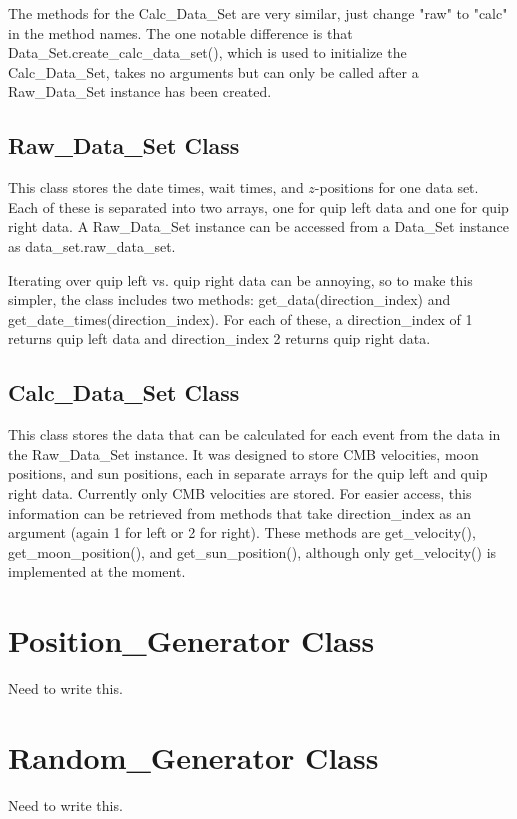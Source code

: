 \documentclass[12pt]{report}
\begin{document}
The methods for the Calc\_Data\_Set are very similar, just change "raw" to "calc" in the method names.  The one notable difference is that Data\_Set.create\_calc\_data\_set(), which is used to initialize the Calc\_Data\_Set, takes no arguments but can only be called after a Raw\_Data\_Set instance has been created.

\section{Raw\_Data\_Set Class}
This class stores the date times, wait times, and $z$-positions for one data set.  Each of these is separated into two arrays, one for quip left data and one for quip right data.  A Raw\_Data\_Set instance can be accessed from a Data\_Set instance as data\_set.raw\_data\_set.

Iterating over quip left vs. quip right data can be annoying, so to make this simpler, the class includes two methods: get\_data(direction\_index) and get\_date\_times(direction\_index).  For each of these, a direction\_index of 1 returns quip left data and direction\_index 2 returns quip right data.

\section{Calc\_Data\_Set Class}
This class stores the data that can be calculated for each event from the data in the Raw\_Data\_Set instance.  It was designed to store CMB velocities, moon positions, and sun positions, each in separate arrays for the quip left and quip right data.  Currently only CMB velocities are stored.  For easier access, this information can be retrieved from methods that take direction\_index as an argument (again 1 for left or 2 for right).  These methods are get\_velocity(), get\_moon\_position(), and get\_sun\_position(), although only get\_velocity() is implemented at the moment.





\chapter{Position\_Generator Class}
Need to write this.





\chapter{Random\_Generator Class}
Need to write this.
\end{document}
